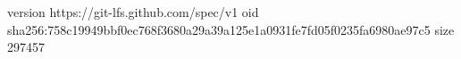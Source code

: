 version https://git-lfs.github.com/spec/v1
oid sha256:758c19949bbf0ec768f3680a29a39a125e1a0931fe7fd05f0235fa6980ae97c5
size 297457
